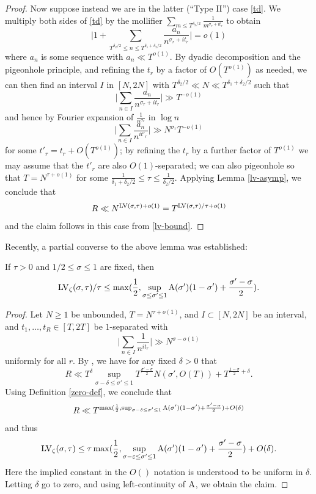 \begin{proof}
Now suppose instead we are in the latter (``Type II'') case \eqref{td}.  We multiply both sides of \eqref{td} by the mollifier $\sum_{m \leq T^{\delta_2/2}} \frac{1}{m^{\sigma_r+it_r}}$ to obtain
$$ \bigg| 1 + \sum_{T^{\delta_2/2} \leq n \leq T^{\delta_1+\delta_2/2}} \frac{a_n}{n^{\sigma_r+it_r}} \bigg| = o(1)$$
where $a_n$ is some sequence with $a_n \ll T^{o(1)}$.  By dyadic decomposition and the pigeonhole principle, and refining the $t_r$ by a factor of $O(T^{o(1)})$ as needed, we can then find an interval $I$ in $[N,2N]$ with $T^{\delta_2/2} \ll N \ll T^{\delta_1+\delta_2/2}$ such that
$$ \bigg| \sum_{n \in I} \frac{a_n}{n^{\sigma_r+it_r}} \bigg| \gg T^{-o(1)}$$
and hence by Fourier expansion of $\frac{1}{n^{\sigma_r}}$ in $\log n$
$$ \bigg| \sum_{n \in I} \frac{a_n}{n^{it'_r}} \bigg| \gg N^{\sigma_r} T^{-o(1)}$$
for some $t'_r = t_r + O(T^{o(1)})$; by refining the $t_r$ by a further factor of $T^{o(1)}$ we may assume that the $t'_r$ are also $O(1)$-separated; we can also pigeonhole so that $T = N^{\tau+o(1)}$ for some $\frac{1}{\delta_1+\delta_2/2} \leq \tau \leq \frac{1}{\delta_2/2}$.  Applying Lemma \ref{lv-asymp}, we conclude that
$$ R \ll N^{\mathrm{LV}(\sigma,\tau)+o(1)} = T^{\mathrm{LV}(\sigma,\tau)/\tau+o(1)}$$
and the claim follows in this case from \eqref{lv-bound}.
\end{proof}

Recently, a partial converse to the above lemma was established:

\begin{lemma}\label{zero-dens_implies_large}\cite[Theorem 1.2]{matomaki_teravainen_2024} If $\tau > 0$ and $1/2 \leq \sigma \leq 1$ are fixed, then
    $$ \mathrm{LV}_\zeta(\sigma,\tau)/\tau \leq \max( \frac{1}{2}, \sup_{\sigma \leq \sigma' \leq 1} \mathrm{A}(\sigma')(1-\sigma') + \frac{\sigma'-\sigma}{2} ).$$
\end{lemma}

\begin{proof}  Let $N \geq 1$ be unbounded, $T = N^{\tau+o(1)}$, and $I \subset [N,2N]$ be an interval, and $t_1,\dots,t_R \in [T,2T]$ be $1$-separated with
$$ \bigg| \sum_{n \in I} \frac{1}{n^{it_r}} \bigg| \gg N^{\sigma-o(1)}$$
uniformly for all $r$.  By \cite[Theorem 1.2]{matomaki_teravainen_2024}, we have for any fixed $\delta>0$ that
$$ R \ll T^\delta \sup_{\sigma-\delta \leq \sigma' \leq 1} T^{\frac{\sigma' - \sigma}{2}} N(\sigma', O(T)) + T^{\frac{1-\sigma}{2}+\delta}.$$
Using Definition \ref{zero-def}, we conclude that
$$ R \ll T^{\max( \frac{1}{2}, \sup_{\sigma-\delta \leq \sigma' \leq 1} \mathrm{A}(\sigma')(1-\sigma') + \frac{\sigma'-\sigma}{2} ) + O(\delta)}$$
and thus
$$ \mathrm{LV}_\zeta(\sigma,\tau) \leq \tau \max( \frac{1}{2}, \sup_{\sigma-\varepsilon \leq \sigma' \leq 1} \mathrm{A}(\sigma')(1-\sigma') + \frac{\sigma'-\sigma}{2} ) + O(\delta).$$
Here the implied constant in the $O()$ notation is understood to be uniform in $\delta$.
Letting $\delta$ go to zero, and using left-continuity of $\mathrm{A}$, we obtain the claim.
\end{proof}

